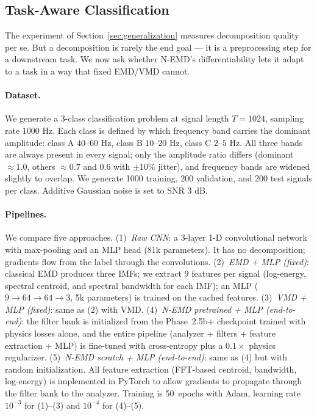\documentclass[journal]{IEEEtran}
\begin{document}
\subsection{Task-Aware Classification}
\label{sec:task-aware}

The experiment of Section~\ref{sec:generalization} measures decomposition quality per se. But a decomposition is rarely the end goal --- it is a preprocessing step for a downstream task. We now ask whether N-EMD's differentiability lets it adapt to a task in a way that fixed EMD/VMD cannot.

\paragraph{Dataset.} We generate a 3-class classification problem at signal length $T = 1024$, sampling rate $1000$ Hz. Each class is defined by which frequency band carries the dominant amplitude: class A $40$--$60$ Hz, class B $10$--$20$ Hz, class C $2$--$5$ Hz. All three bands are always present in every signal; only the amplitude ratio differs (dominant $\approx 1.0$, others $\approx 0.7$ and $0.6$ with $\pm 10\%$ jitter), and frequency bands are widened slightly to overlap. We generate 1000 training, 200 validation, and 200 test signals per class. Additive Gaussian noise is set to SNR $3$ dB. %

\paragraph{Pipelines.} We compare five approaches. (1)~\emph{Raw CNN}: a 3-layer 1-D convolutional network with max-pooling and an MLP head (81k parameters). It has no decomposition; gradients flow from the label through the convolutions. (2)~\emph{EMD + MLP (fixed)}: classical EMD produces three IMFs; we extract 9 features per signal (log-energy, spectral centroid, and spectral bandwidth for each IMF); an MLP ($9 \to 64 \to 64 \to 3$, 5k parameters) is trained on the cached features. (3)~\emph{VMD + MLP (fixed)}: same as (2) with VMD. (4)~\emph{N-EMD pretrained + MLP (end-to-end)}: the filter bank is initialized from the Phase~2.5b+ checkpoint trained with physics losses alone, and the entire pipeline (analyzer + filters + feature extraction + MLP) is fine-tuned with cross-entropy plus a $0.1{\times}$ physics regularizer. (5)~\emph{N-EMD scratch + MLP (end-to-end)}: same as (4) but with random initialization. All feature extraction (FFT-based centroid, bandwidth, log-energy) is implemented in PyTorch to allow gradients to propagate through the filter bank to the analyzer. Training is 50~epochs with Adam, learning rate $10^{-3}$ for (1)--(3) and $10^{-4}$ for (4)--(5).
\end{document}
